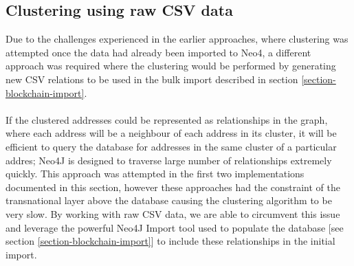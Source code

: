 \subsection{Clustering using raw CSV data}\label{clustering-raw-csv}
Due to the challenges experienced in the earlier approaches, where clustering was attempted once the data had already been imported to Neo4, a different approach was required where the clustering would be performed by generating new CSV relations to be used in the bulk import described in section \ref{section-blockchain-import}. 
\\\\
If the clustered addresses could be represented as relationships in the graph, where each address will be a neighbour of each address in its cluster, it will be efficient to query the database for addresses in the same cluster of a particular addres;  Neo4J is designed to traverse large number of relationships extremely quickly. This approach was attempted in the first two implementations documented in this section, however these approaches had the constraint of the transnational layer above the database causing the clustering algorithm to be very slow. By working with raw CSV data, we are able to circumvent this issue and leverage the powerful Neo4J Import tool used to populate the database [see section \ref{section-blockchain-import}] to include these relationships in the initial import. 

